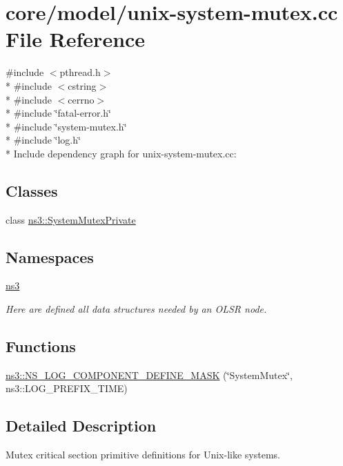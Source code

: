 \hypertarget{unix-system-mutex_8cc}{}\section{core/model/unix-\/system-\/mutex.cc File Reference}
\label{unix-system-mutex_8cc}
{\ttfamily \#include $<$pthread.\+h$>$}\\*
{\ttfamily \#include $<$cstring$>$}\\*
{\ttfamily \#include $<$cerrno$>$}\\*
{\ttfamily \#include \char`\"{}fatal-\/error.\+h\char`\"{}}\\*
{\ttfamily \#include \char`\"{}system-\/mutex.\+h\char`\"{}}\\*
{\ttfamily \#include \char`\"{}log.\+h\char`\"{}}\\*
Include dependency graph for unix-\/system-\/mutex.cc\+:
\subsection*{Classes}
\begin{DoxyCompactItemize}
\item 
class \hyperlink{classns3_1_1SystemMutexPrivate}{ns3\+::\+System\+Mutex\+Private}
\end{DoxyCompactItemize}
\subsection*{Namespaces}
\begin{DoxyCompactItemize}
\item 
 \hyperlink{namespacens3}{ns3}
\begin{DoxyCompactList}\small\item\em Here are defined all data structures needed by an O\+L\+SR node. \end{DoxyCompactList}\end{DoxyCompactItemize}
\subsection*{Functions}
\begin{DoxyCompactItemize}
\item 
\hyperlink{namespacens3_abff25271c39d7a8b353adb4fbd640678}{ns3\+::\+N\+S\+\_\+\+L\+O\+G\+\_\+\+C\+O\+M\+P\+O\+N\+E\+N\+T\+\_\+\+D\+E\+F\+I\+N\+E\+\_\+\+M\+A\+SK} (\char`\"{}System\+Mutex\char`\"{}, ns3\+::\+L\+O\+G\+\_\+\+P\+R\+E\+F\+I\+X\+\_\+\+T\+I\+ME)
\end{DoxyCompactItemize}


\subsection{Detailed Description}
Mutex critical section primitive definitions for Unix-\/like systems. 